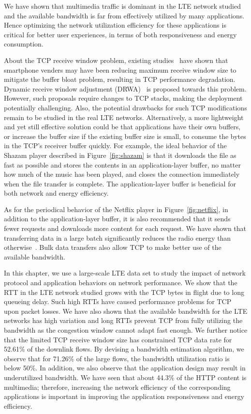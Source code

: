 \label{sec:discussion}

We have shown that multimedia traffic is dominant in the LTE network studied and the available bandwidth is far from effectively utilized by many applications. Hence optimizing the network utilization efficiency for these applications is critical for better user experiences, in terms of both responsiveness and energy consumption.

About the TCP receive window problem, existing studies~\cite{jiang12} have shown that smartphone venders may have been reducing maximum receive window size to mitigate the buffer bloat problem, resulting in TCP performance degradation. Dynamic receive window adjustment (DRWA)~\cite{jiang12} is proposed towards this problem. However, such proposals require changes to TCP stacks, making the deployment potentially challenging. Also, the potential drawbacks for such TCP modifications remain to be studied in the real LTE networks. Alternatively, a more lightweight and yet still effective solution could be that applications have their own buffers, or increase the buffer size if the existing buffer size is small, to consume the bytes in the TCP's receiver buffer quickly. For example, the ideal behavior of the Shazam player described in Figure~\ref{fig:shazam} is that it downloads the file as fast as possible and stores the contents in an application-layer buffer, no matter how much of the music has been played, and closes the connection immediately when the file transfer is complete. The application-layer buffer is beneficial for both network and energy efficiency.

As for the periodical behavior of the Netflix player in Figure~\ref{fig:netflix}, in addition to the application-layer buffer, it is also recommended 
that it sends fewer requests and downloads more content for each request. We have shown that transferring data in a large batch significantly reduces the radio energy than otherwise~\cite{huang_mobisys12}. Bulk data transfers also allow TCP to make better use of the available bandwidth. 

In this chapter, we use a large-scale LTE data set to study the impact of network protocol and application behaviors on network performance. We show that the RTT in the LTE network studied grows with the TCP bytes in flight due to long queueing delay. Such high RTTs have caused performance problems for TCP upon packet losses. We have also shown that the available bandwidth for the LTE networks has high variation and long RTTs prevent TCP from fully utilizing the bandwidth as the congestion window cannot adapt fast enough. We further notice that the limited TCP receive window size has constrained TCP data rate for 52.61\% of the downlink flows. By devising a bandwidth estimation algorithm, we observe that for 71.26\% of the large flows, the bandwidth utilization ratio is below 50\%. In addition, we also observe that the application design may result in underutilized bandwidth. We have seen that about 44.3\% of the HTTP content is multimedia; therefore, increasing the network efficiency of the corresponding applications is important in improving the application responsiveness and energy efficiency.

